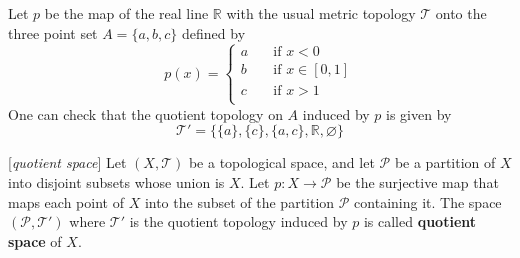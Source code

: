 \begin{example}
	Let $p$ be the map of the real line $\mathbb{R}$ with the usual metric topology $\mathcal{T}$ onto the three point set $A = \{a, b, c\}$ defined by
	$$
	p(x) = 
	\begin{cases}
	a &\quad\text{if }x<0\\
	b &\quad\text{if }x\in[0,1]\\
	c &\quad\text{if }x>1\\
	\end{cases}$$
	One can check that the quotient topology on $A$ induced by $p$ is given by $$ \mathcal{T}'=\{ \{a\},  \{c\}, \{a,c\},\mathbb{R}, \varnothing\}$$
\end{example}

\begin{definition}{[\textit{quotient space}]}
	Let $(X,\mathcal{T})$ be a topological space, and let $\mathcal{P}$ be a partition of $X$ into disjoint subsets whose union is $X$. Let $p:X\rightarrow \mathcal{P}$ be the surjective map that maps each point of $X$ into the subset of the partition $\mathcal{P}$ containing it. The space $(\mathcal{P},\mathcal{T}')$ where $\mathcal{T'}$ is the quotient topology induced by $p$ is called \textbf{quotient space} of $X$.
\end{definition}

